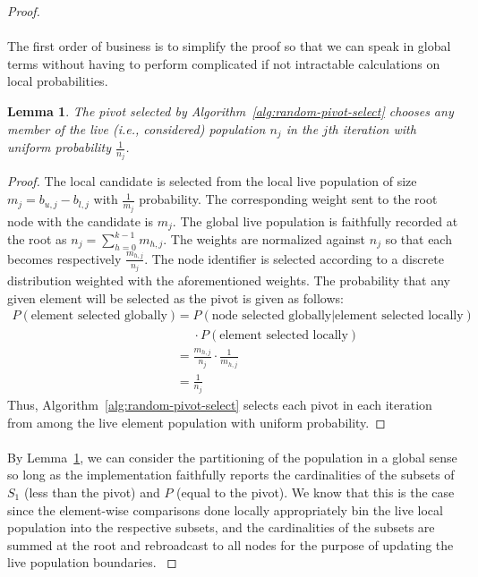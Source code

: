 \documentclass[11pt,epsf]{article}
\newtheorem{lemma}{Lemma}
\begin{document}
{{\begin{proof}
      \paragraph{}{
        The first order of business is to simplify the proof so that we can
        speak in global terms without having to perform complicated
        if not intractable calculations on local probabilities.
      }
      \begin{lemma}
        \label{lem:goodpivot}
        The pivot selected by Algorithm~\ref{alg:random-pivot-select} chooses any
        member of the live (i.e., considered) population $n_j$ in the $j$th iteration
        with uniform probability $\frac{1}{n_j}$.
      \end{lemma}
      \begin{proof}
        The local candidate is selected from the local live population of size $m_j = b_{u,j} - b_{l,j}$
        with $\frac{1}{m_j}$ probability. The corresponding weight sent to the root
        node with the candidate is $m_j$. The global live population is faithfully
        recorded at the root as $n_j = \sum_{h=0}^{k-1} m_{h,j}$. The weights are normalized
        against $n_j$ so that each becomes respectively $\frac{m_{h,j}}{n_j}$.
        The node identifier is selected according to a discrete distribution weighted
        with the aforementioned weights. The probability that any given element
        will be selected as the pivot is given as follows:
        \begin{align*}
          P(\text{element selected globally})
          &= P(\text{node selected globally}|\text{element selected locally})\\
          &\phantom{= }\cdot P(\text{element selected locally}) \\
          &= \frac{m_{h,j}}{n_j} \cdot \frac{1}{m_{h,j}} \\
          &= \frac{1}{n_j}
        \end{align*}
        Thus, Algorithm~\ref{alg:random-pivot-select} selects each pivot in each
        iteration from among the live element population with uniform probability.
      \end{proof}
      \paragraph{}{
        By Lemma~\ref{lem:goodpivot}, we can consider the partitioning of the population
        in a global sense so long as the implementation faithfully reports the cardinalities
        of the subsets of $S_1$ (less than the pivot) and $P$ (equal to the pivot).
        We know that this is the case since the element-wise comparisons done locally
        appropriately bin the live local population into the respective subsets,
        and the cardinalities of the subsets are summed at the root and rebroadcast
        to all nodes for the purpose of updating the live population boundaries.
      }

\end{proof}}}
\end{document}
